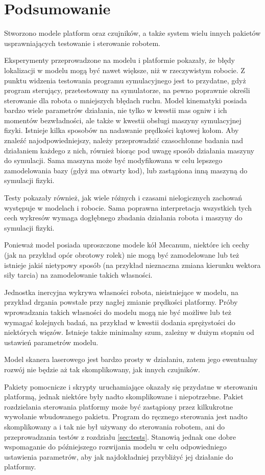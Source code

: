 \chapter{Podsumowanie}
\label{sec:ending}

Stworzono modele platform oraz czujników, a także system wielu innych pakietów usprawniających testowanie i sterowanie robotem.

Eksperymenty przeprowadzone na modelu i platformie pokazały, że błędy lokalizacji w modelu mogą być nawet większe, niż w rzeczywistym robocie.
Z punktu widzenia testowania programu symulacyjnego jest to przydatne, gdyż program sterujący, przetestowany na symulatorze, na pewno poprawnie określi sterowanie
dla robota o mniejszych błędach ruchu.
Model kinematyki posiada bardzo wiele parametrów działania, nie tylko w kwestii mas ogniw i ich momentów bezwładności, ale
także w kwestii obsługi maszyny symulacyjnej fizyki.
Istnieje kilka sposobów na nadawanie prędkości kątowej kołom.
Aby znaleźć najodpowiedniejszy, należy przeprowadzić czasochłonne badania nad działaniem każdego z nich, również biorąc pod uwagę sposób działania maszyny do symulacji.
Sama maszyna może być modyfikowana w celu lepszego zamodelowania bazy (gdyż ma otwarty kod), lub zastąpiona inną maszyną do symulacji fizyki.

Testy pokazały również, jak wiele różnych i czasami nielogicznych zachowań występuje w modelach i robocie.
Sama poprawna interpretacja wszystkich tych cech wykresów wymaga dogłębnego zbadania działania robota i maszyny do symulacji fizyki.

Ponieważ model posiada uproszczone modele kół Mecanum, niektóre ich cechy (jak na przykład opór obrotowy rolek) nie mogą być zamodelowane
lub też istnieje jakiś nietypowy sposób (na przykład nieznaczna zmiana kierunku wektora siły tarcia) na zamodelowanie takich własności.

Jednostka inercyjna wykrywa własności robota, nieistniejące w modelu, na przykład drgania powstałe przy nagłej zmianie prędkości platformy.
Próby wprowadzania takich własności do modelu mogą nie być możliwe lub też wymagać kolejnych badań, na przykład w kwestii dodania sprężystości do niektórych więzów.
Istnieje także minimalny szum, zależny w dużym stopniu od ustawień parametrów modelu.

Model skanera laserowego jest bardzo prosty w działaniu, zatem jego ewentualny rozwój nie będzie aż tak skomplikowany, jak innych czujników.

Pakiety pomocnicze i skrypty uruchamiające okazały się przydatne w sterowaniu platformą, jednak niektóre były nadto skomplikowane i niepotrzebne.
Pakiet rozdzielania sterowania platformy może być zastąpiony przez kilkukrotne wywołanie wbudowanego pakietu.
Program do ręcznego sterowania jest nadto skomplikowany a i tak nie był używany do sterowania robotem, ani do przeprowadzania testów z rozdziału \ref{sec:tests}.
Stanowią jednak one dobre wspomaganie do późniejszego rozwijania modelu w celu odpowiedniego ustawienia parametrów, aby jak najdokładniej przybliżyć jej działanie do platformy.


